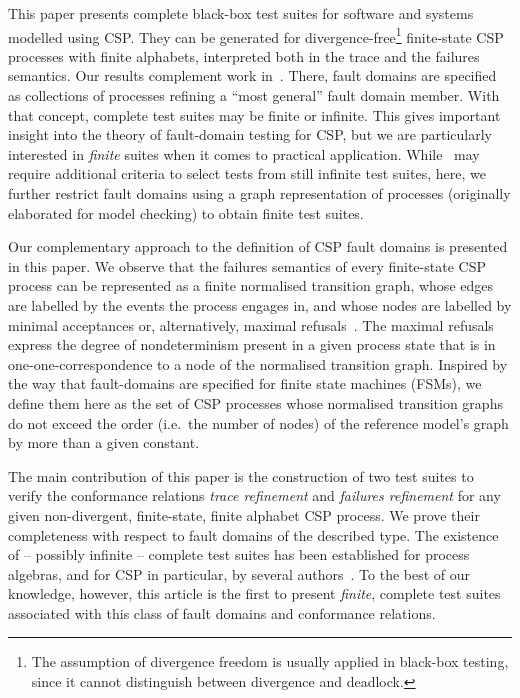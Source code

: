 This paper presents complete black-box test suites for software and systems
modelled using CSP. They can be generated for divergence-free\footnote{The
assumption of divergence freedom is usually applied in black-box testing,
since it cannot distinguish between divergence and deadlock.} finite-state
CSP processes with finite alphabets, interpreted both in the trace and the
failures semantics. Our results complement work
in~\cite{DBLP:conf/pts/CavalcantiS17}. There, fault domains are specified as
collections of processes refining a ``most general'' fault domain member.
With that concept, complete test suites may be finite or infinite. This gives
important insight into the theory of fault-domain testing for CSP, but we are
particularly interested in {\it finite} suites when it comes to practical
application. While~\cite{DBLP:conf/pts/CavalcantiS17} may require additional
criteria to select tests from still infinite test suites, here, we further
restrict fault domains using a graph representation of processes (originally
elaborated for model checking) to obtain finite test suites. 

Our complementary approach to the definition of CSP fault domains is
presented in this paper. We observe that the failures semantics of
every finite-state CSP process can
be represented as a finite normalised transition graph, whose edges are
labelled by the events the process engages in, and whose nodes are labelled
by minimal acceptances or, alternatively, maximal
refusals~\cite{Roscoe:1994:CME:197600}. The maximal refusals express the
degree of nondeterminism present in a given process state that is in
one-one-correspondence to a node of the normalised transition graph. Inspired
by the way that fault-domains are specified for finite state machines (FSMs),
we define them here as the set of CSP processes whose normalised transition graphs
do not exceed the order (i.e.~the number of nodes)
of the reference model's graph by more than a given
constant.

The main contribution of this paper is the construction of two test suites to
verify the conformance relations \emph{trace refinement} and \emph{failures
refinement} for any given non-divergent, finite-state, finite alphabet CSP
process. We prove their completeness with respect to fault domains
of the described type.  The existence of -- possibly infinite -- complete
test suites has been established for process algebras, and for CSP in
particular, by several
authors~\cite{Hennessy:1988:ATP:50497,Schneider:1995:OST:203471.203475,DBLP:conf/fm/PeleskaS96,peleska1997a,DBLP:conf/icfem/CavalcantiG07,DBLP:conf/pts/CavalcantiS17}.
To the best of our knowledge, however, this article is the first to present
{\it finite}, complete test suites associated with this class of fault
domains and conformance relations.


